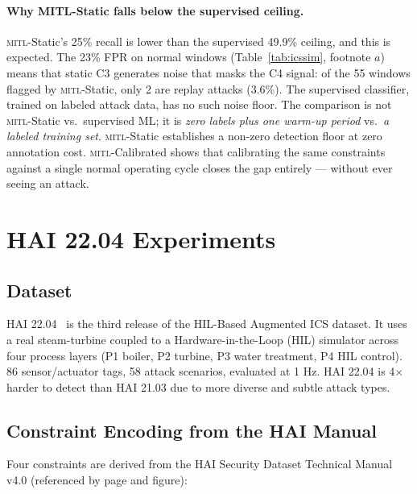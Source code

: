 \documentclass[sigconf,anonymous,review]{acmart}
\newcommand{\mitl}{\textsc{mitl}\xspace}
\begin{document}
\paragraph{Why MITL-Static falls below the supervised ceiling.}
\mitl-Static's 25\% recall is lower than the supervised 49.9\% ceiling, and
this is expected.  The 23\% FPR on normal windows (Table~\ref{tab:icssim},
footnote $a$) means that static C3 generates noise that masks the C4 signal:
of the 55 windows flagged by \mitl-Static, only 2 are replay attacks (3.6\%).
The supervised classifier, trained on labeled attack data, has no such
noise floor.  The comparison is not \mitl-Static vs.\ supervised ML; it is
\emph{zero labels plus one warm-up period} vs.\ \emph{a labeled training set}.
\mitl-Static establishes a non-zero detection floor at zero annotation cost.
\mitl-Calibrated shows that calibrating the same constraints against a single
normal operating cycle closes the gap entirely — without ever seeing an attack.

\section{HAI 22.04 Experiments}
\label{sec:hai}

\subsection{Dataset}
HAI 22.04~\cite{HAI2022} is the third release of the HIL-Based Augmented ICS
dataset.  It uses a real steam-turbine coupled to a Hardware-in-the-Loop (HIL)
simulator across four process layers (P1 boiler, P2 turbine, P3 water
treatment, P4 HIL control).  86 sensor/actuator tags, 58 attack scenarios,
evaluated at 1 Hz.  HAI 22.04 is 4$\times$ harder to detect than HAI 21.03
due to more diverse and subtle attack types.

\subsection{Constraint Encoding from the HAI Manual}
Four constraints are derived from the HAI Security Dataset Technical Manual
v4.0 (referenced by page and figure):
\end{document}
